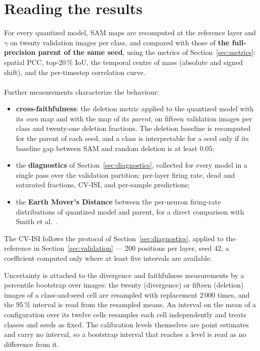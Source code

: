\section{Reading the results}
\label{sec:reading}

For every quantized model, SAM maps are recomputed at the reference layer and
$\gamma$ on twenty validation images per class, and compared with those of
\textbf{the full-precision parent of the same seed}, using the metrics of
Section~\ref{sec:metrics}: spatial PCC, top-20\,\% IoU, the temporal centre of
mass (absolute and signed shift), and the per-timestep correlation curve.

\paragraph{}Further measurements characterize the behaviour:
\begin{itemize}
  \item \textbf{cross-faithfulness}: the deletion metric applied to the quantized
        model with its \emph{own} map and with the map of its \emph{parent}, on
        fifteen validation images per class and twenty-one deletion fractions.
        The deletion baseline is
        recomputed for the parent of each seed, and a class is interpretable for
        a seed only if its baseline gap between SAM and random deletion is at
        least $0.05$;
  \item the \textbf{diagnostics} of Section~\ref{sec:diagnostics}, collected for
        every model in a single pass over the validation partition: per-layer
        firing rate, dead and saturated fractions, CV-ISI, and per-sample
        predictions;
  \item the \textbf{Earth Mover's Distance} between the per-neuron firing-rate
        distributions of quantized model and parent, for a direct comparison with
        Smith et al.~\cite{smith2026}.
\end{itemize}


The CV-ISI follows the protocol of Section~\ref{sec:diagnostics}, applied to the
reference in Section~\ref{sec:validation} --- 200
positions per layer, seed 42, a coefficient computed only where at least five
intervals are available.

Uncertainty is attached to the divergence and faithfulness measurements by a
percentile bootstrap over images: the twenty (divergence) or fifteen (deletion)
images of a class-and-seed cell are resampled with replacement $2\,000$ times,
and the 95\,\% interval is read from the resampled means. An interval on the mean
of a configuration over its twelve cells resamples each cell independently and
treats classes and seeds as fixed. The calibration levels themselves are point
estimates and carry no interval, so a bootstrap interval that reaches a level is
read as no difference from it.

